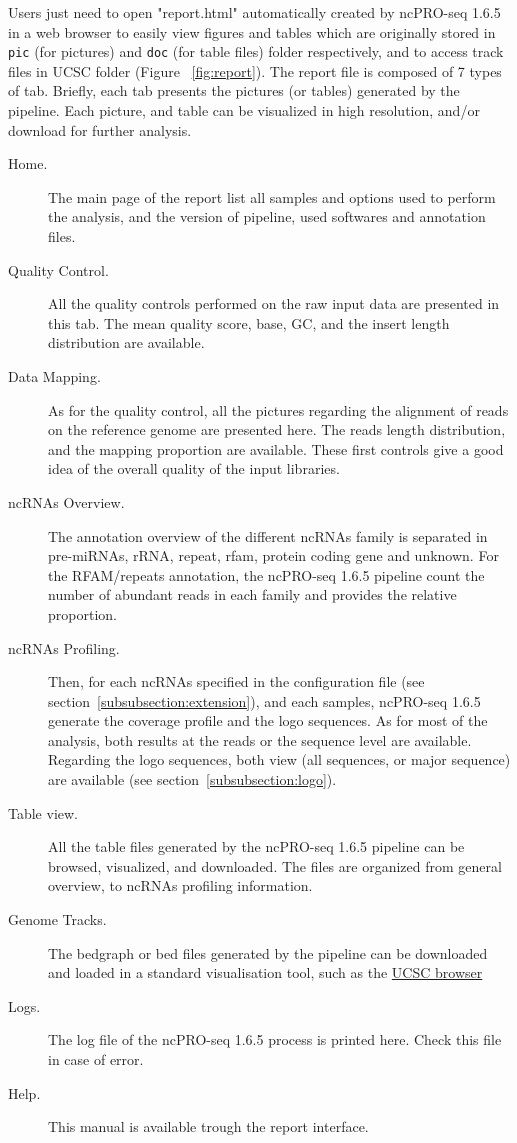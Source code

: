 \documentclass[12pt]{article}
\def \ncpip{ncPRO-seq 1.6.5}
\begin{document}
Users just need to open "report.html" automatically created by \ncpip{} in a web browser to easily view figures and tables which are originally stored in \verb+pic+ (for pictures) and \verb+doc+ (for table files) folder respectively, and to access track files in UCSC folder (Figure ~\ref{fig:report}). The report file is composed of 7 types of tab. Briefly, each tab presents the pictures (or tables) generated by the pipeline. Each picture, and table can be visualized in high resolution, and/or download for further analysis. 
\begin{description}
 \item[Home.] The main page of the report list all samples and options used to perform the analysis, and the version of pipeline, used softwares and annotation files.
 \item[Quality Control.] All the quality controls performed on the raw input data are presented in this tab. The mean quality score, base, GC, and the insert length distribution are available.
 \item[Data Mapping.] As for the quality control, all the pictures regarding the alignment of reads on the reference genome are presented here. The reads length distribution, and the mapping proportion are available. These first controls give a good idea of the overall quality of the input libraries.
 \item[ncRNAs Overview.] The annotation overview of the different ncRNAs family is separated in pre-miRNAs, rRNA, repeat, rfam, protein coding gene and unknown. For the RFAM/repeats annotation, the \ncpip{} pipeline count the number of abundant reads in each family and provides the relative proportion.
 \item[ncRNAs Profiling.] Then, for each ncRNAs specified in the configuration file (see section~\ref{subsubsection:extension}), and each samples, \ncpip{} generate the coverage profile and the logo sequences. As for most of the analysis, both results at the reads or the sequence level are available. Regarding the logo sequences, both view (all sequences, or major sequence) are available (see section~\ref{subsubsection:logo}).
 \item[Table view.] All the table files generated by the \ncpip{} pipeline can be browsed, visualized, and downloaded. The files are organized from general overview, to ncRNAs profiling information.
 \item[Genome Tracks.] The bedgraph or bed files generated by the pipeline can be downloaded and loaded in a standard visualisation tool, such as the \href{http://genome.ucsc.edu/index.html}{ UCSC browser} \cite{Dreszer2012}
 \item[Logs.] The log file of the \ncpip{} process is printed here. Check this file in case of error.
 \item[Help.] This manual is available trough the report interface.
 \end{description}
\end{document}
